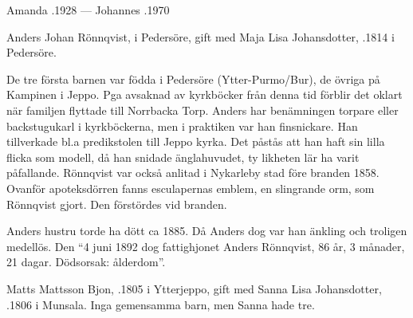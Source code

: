 Amanda .1928  ---  Johannes .1970


Anders Johan Rönnqvist,  i Pedersöre, gift med Maja Lisa Johansdotter, .1814 i Pedersöre.
\begin{jhchildren}
  \item {}
  \item {}
  \item {}
  \item {}
  \item {}
  \item {}
  \item {}
  \item {}
\end{jhchildren}

De tre första barnen var födda i Pedersöre (Ytter-Purmo/Bur), de övriga på Kampinen i Jeppo. Pga avsaknad av kyrkböcker från denna tid förblir det oklart när familjen flyttade till Norrbacka Torp. Anders har benämningen torpare eller backstugukarl i kyrkböckerna, men i praktiken var han finsnickare. Han tillverkade bl.a predikstolen till Jeppo kyrka. Det påstås att han haft sin lilla flicka som modell, då han snidade änglahuvudet, ty likheten lär ha varit påfallande. Rönnqvist var också anlitad i Nykarleby stad före branden 1858. Ovanför apoteksdörren fanns esculapernas emblem, en slingrande orm, som Rönnqvist gjort. Den förstördes vid branden.

Anders hustru torde ha dött ca 1885. Då Anders dog var han änkling och troligen medellös. Den ``4 juni 1892 dog fattighjonet Anders Rönnqvist, 86 år, 3 månader, 21 dagar. Dödsorsak: ålderdom''.


Matts Mattsson Bjon, .1805 i Ytterjeppo, gift med Sanna Lisa Johansdotter, .1806 i Munsala. Inga gemensamma barn, men Sanna hade tre.
\begin{jhchildren}
  \item {}
  \item {}
  \item {}
\end{jhchildren}

